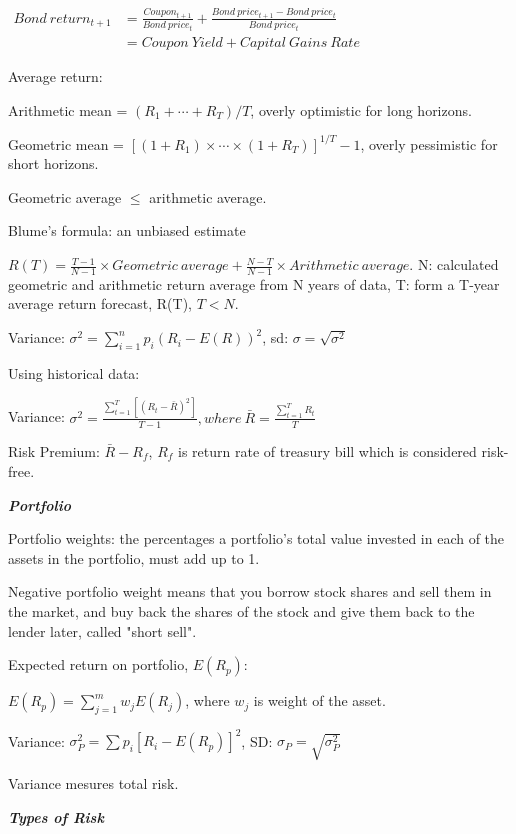 \documentclass{article}
\newcommand{\smalltitle}[1]{
	\noindent
	\textbf{\textit{#1}}
}
\begin{document}
\noindent
$
\begin{aligned}
Bond\ return_{t+1}  &= \frac{Coupon_{t+1}}{Bond\ price_t} + \frac{Bond\ price_{t+1}-Bond\ price_{t}}{Bond\ price_t}\\
&= Coupon\ Yield + Capital\ Gains\ Rate
\end{aligned}
$

Average return:

Arithmetic mean = $(R_1+\cdots + R_T)/T$, overly optimistic for long horizons.

Geometric mean = $[(1+R_1)\times \cdots \times (1+R_T)]^{1/T}-1$, overly pessimistic for short horizons.

Geometric average $\leq$ arithmetic average.

Blume's formula: an unbiased estimate

$R(T) = \frac{T-1}{N-1}\times Geometric\ average + \frac{N-T}{N-1} \times Arithmetic\ average$.
N: calculated geometric and arithmetic return average from N years of data, T: form a T-year average return forecast, R(T), $T<N$.

Variance: $\sigma^2 = \sum \limits_{i=1}^{n}p_i(R_i-E(R))^2$, 
sd: $\sigma = \sqrt{\sigma^2}$

Using historical data:

Variance: $\sigma^2 = \frac{\sum \limits_{t=1}^{T}[(R_t-\bar{R})^2]}{T-1},where\ \bar{R} = \frac{\sum \limits_{t=1}^{T}R_t}{T}$

Risk Premium: $\bar{R} - R_{\mathit{f}}$, $R_\mathit{f}$ is return rate of treasury bill which is considered risk-free.

\smalltitle{Portfolio}

Portfolio weights: the percentages a portfolio’s total value invested in each of the assets in the portfolio, must add up to 1.

Negative portfolio weight means that you borrow stock shares and sell them in the market, and buy back the shares of the stock and give them back to the lender later, called "short sell".

Expected return on portfolio, $E(R_p)$:

$E(R_p) = \sum \limits_{j=1}^mw_jE(R_j)$, where $w_j$ is weight of the asset.

Variance: $\sigma_P^2 = \sum p_i[R_i-E(R_p)]^2$, 
SD: $\sigma_P = \sqrt{\sigma_P^2}$

Variance mesures total risk.



\smalltitle{Types of Risk}
\end{document}
